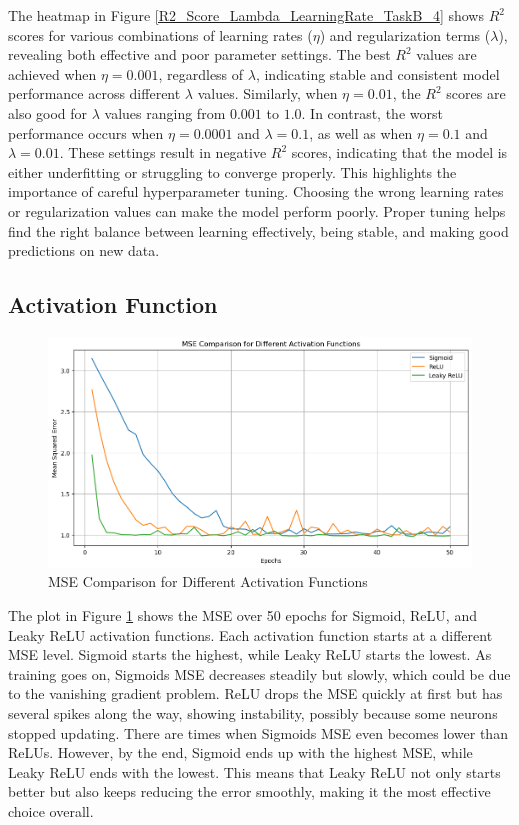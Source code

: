 \documentclass{article}
\newcommand{\0}{\mathbf{0}}
\newcommand{\1}{\mathbf{1}}
\begin{document}
The heatmap in Figure \ref{R2_Score_Lambda_LearningRate_TaskB_4} shows \( R^2 \) scores for various combinations of learning rates (\(\eta\)) and regularization terms (\(\lambda\)), revealing both effective and poor parameter settings. The best \( R^2 \) values are achieved when \( \eta =0.001\), regardless of \(\lambda\), indicating stable and consistent model performance across different \(\lambda\) values. Similarly, when \( \eta = 0.01\), the \( R^2 \) scores are also good for \(\lambda\) values ranging from \(0.001\) to \(1.0\). In contrast, the worst performance occurs when \( \eta = 0.0001\) and \(\lambda = 0.1\), as well as when \(\eta = 0.1\) and \(\lambda = 0.01\). These settings result in negative \( R^2 \) scores, indicating that the model is either underfitting or struggling to converge properly. This highlights the importance of careful hyperparameter tuning. Choosing the wrong learning rates or regularization values can make the model perform poorly. Proper tuning helps find the right balance between learning effectively, being stable, and making good predictions on new data.


\subsection{Activation Function}


\begin{figure}[h!]
    \centering
    \includegraphics[width=0.9\linewidth]{TaskC_1.png}
    \caption{MSE Comparison for Different Activation Functions}
    \label{TaskC_1}
\end{figure}

The plot in Figure \ref{TaskC_1} shows the MSE over 50 epochs for Sigmoid, ReLU, and Leaky ReLU activation functions. Each activation function starts at a different MSE level. Sigmoid starts the highest, while Leaky ReLU starts the lowest. As training goes on, Sigmoids MSE decreases steadily but slowly, which could be due to the vanishing gradient problem. ReLU drops the MSE quickly at first but has several spikes along the way, showing instability, possibly because some neurons stopped updating. There are times when Sigmoids MSE even becomes lower than ReLUs. However, by the end, Sigmoid ends up with the highest MSE, while Leaky ReLU ends with the lowest. This means that Leaky ReLU not only starts better but also keeps reducing the error smoothly, making it the most effective choice overall.
\end{document}

